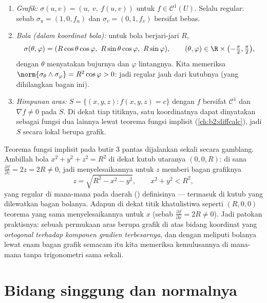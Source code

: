 \begin{example}\label{ex:b2:surfaces:standard}
\leavevmode
\begin{enumerate}
\item \emph{Grafik:} $\sigma(u, v) = (u,\ v,\ f(u, v))$ untuk $f \in
\mathcal{C}^1(U)$. Selalu regular: sebab $\sigma_u = (1, 0, f_u)$ dan
$\sigma_v = (0, 1, f_v)$ bersifat bebas.
\item \emph{Bola (dalam koordinat bola):} untuk bola berjari-jari
$R$,
\[
\sigma(\theta, \varphi)
= (R\cos\theta\cos\varphi,\ R\sin\theta\cos\varphi,\
R\sin\varphi),
\qquad
(\theta, \varphi) \in \R \times
\bigl(-\tfrac\pi2, \tfrac\pi2\bigr),
\]
dengan $\theta$ menyatakan bujurnya dan $\varphi$ lintangnya. Kita memeriksa
$\norm{\sigma_\theta \wedge \sigma_\varphi} = R^2\cos\varphi > 0$:
jadi regular jauh dari kutubnya (yang dihilangkan bagan ini).
\item \emph{Himpunan aras:} $S = \{(x,y,z) : f(x, y, z) = c\}$ dengan
$f$ bersifat $\mathcal{C}^1$ dan $\nabla f \neq 0$ pada $S$. Di dekat tiap
titiknya, satu koordinatnya dapat dinyatakan sebagai fungsi dua
lainnya lewat teorema fungsi implisit (\cref{ch:b2:diffcalc}), jadi
$S$ secara lokal berupa grafik.
\end{enumerate}
\end{example}

\begin{example}
\label{ex:b2:surfaces:levelgraph}
Teorema fungsi implisit pada butir 3 pantas dijalankan sekali
secara gamblang. Ambillah bola $x^2 + y^2 + z^2 = R^2$ di dekat kutub
utaranya $(0, 0, R)$: di sana $\frac{\partial f}{\partial z} = 2z =
2R \neq 0$, jadi menyelesaikannya untuk $z$ memberi bagan grafiknya
\[
z = \sqrt{R^2 - x^2 - y^2},
\qquad x^2 + y^2 < R^2 ,
\]
yang regular di mana-mana pada daerah () definisinya --- termasuk
di kutub yang dilewatkan bagan bolanya. Adapun di dekat titik khatulistiwa
seperti $(R, 0, 0)$ teorema yang sama menyelesaikannya untuk $x$
(sebab $\frac{\partial f}{\partial x} = 2R \neq 0$). Jadi patokan
praktisnya: sebuah permukaan aras berupa grafik di atas bidang koordinat
yang \emph{ortogonal terhadap komponen gradien terbesarnya},
dan dengan meliputi bolanya lewat enam bagan grafik semacam itu kita
memeriksa kemulusannya di mana-mana tanpa trigonometri sama
sekali.
\end{example}

\section{Bidang singgung dan normalnya}

